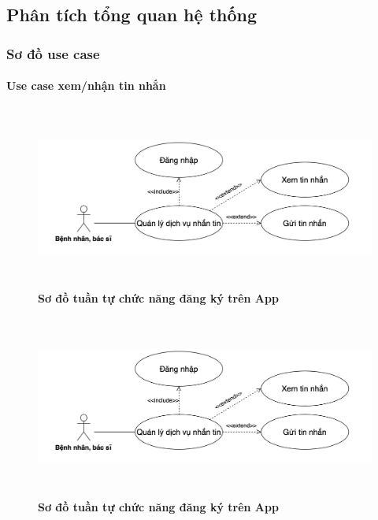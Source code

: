 \subsection{Phân tích tổng quan hệ thống}



\subsubsection{Sơ đồ use case}

\paragraph{Use case xem/nhận tin nhắn}
\mbox{}

  \begin{figure}[H]
    \centering
    \includegraphics[width=15cm,height=6cm]{Images/mobile_app/use_case_send_receive_message.png}
    \caption[Sơ đồ tuần tự chức năng đăng ký trên App]{\bfseries \fontsize{12pt}{0pt}
    \selectfont Sơ đồ tuần tự chức năng đăng ký trên App}
    \label{hinh21} %
  \end{figure}

  \begin{figure}[H]
    \centering
    \includegraphics[width=15cm,height=6cm]{Images/mobile_app/use_case_send_receive_message.png}
    \caption[Sơ đồ tuần tự chức năng đăng ký trên App]{\bfseries \fontsize{12pt}{0pt}
    \selectfont Sơ đồ tuần tự chức năng đăng ký trên App}
    \label{hinh21} %
  \end{figure}

